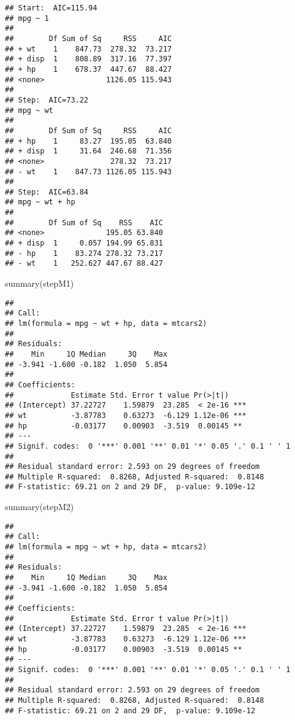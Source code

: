 \documentclass[
]{book}
\newenvironment{Shaded}{\begin{snugshade}}{\end{snugshade}}
\newcommand{\FunctionTok}[1]{\textcolor[rgb]{0.00,0.00,0.00}{#1}}
\newcommand{\NormalTok}[1]{#1}
\begin{document}
\begin{verbatim}
## Start:  AIC=115.94
## mpg ~ 1
## 
##        Df Sum of Sq     RSS     AIC
## + wt    1    847.73  278.32  73.217
## + disp  1    808.89  317.16  77.397
## + hp    1    678.37  447.67  88.427
## <none>              1126.05 115.943
## 
## Step:  AIC=73.22
## mpg ~ wt
## 
##        Df Sum of Sq     RSS     AIC
## + hp    1     83.27  195.05  63.840
## + disp  1     31.64  246.68  71.356
## <none>               278.32  73.217
## - wt    1    847.73 1126.05 115.943
## 
## Step:  AIC=63.84
## mpg ~ wt + hp
## 
##        Df Sum of Sq    RSS    AIC
## <none>              195.05 63.840
## + disp  1     0.057 194.99 65.831
## - hp    1    83.274 278.32 73.217
## - wt    1   252.627 447.67 88.427
\end{verbatim}

\begin{Shaded}
\begin{Highlighting}[]
\FunctionTok{summary}\NormalTok{(stepM1)}
\end{Highlighting}
\end{Shaded}

\begin{verbatim}
## 
## Call:
## lm(formula = mpg ~ wt + hp, data = mtcars2)
## 
## Residuals:
##    Min     1Q Median     3Q    Max 
## -3.941 -1.600 -0.182  1.050  5.854 
## 
## Coefficients:
##             Estimate Std. Error t value Pr(>|t|)    
## (Intercept) 37.22727    1.59879  23.285  < 2e-16 ***
## wt          -3.87783    0.63273  -6.129 1.12e-06 ***
## hp          -0.03177    0.00903  -3.519  0.00145 ** 
## ---
## Signif. codes:  0 '***' 0.001 '**' 0.01 '*' 0.05 '.' 0.1 ' ' 1
## 
## Residual standard error: 2.593 on 29 degrees of freedom
## Multiple R-squared:  0.8268, Adjusted R-squared:  0.8148 
## F-statistic: 69.21 on 2 and 29 DF,  p-value: 9.109e-12
\end{verbatim}

\begin{Shaded}
\begin{Highlighting}[]
\FunctionTok{summary}\NormalTok{(stepM2)}
\end{Highlighting}
\end{Shaded}

\begin{verbatim}
## 
## Call:
## lm(formula = mpg ~ wt + hp, data = mtcars2)
## 
## Residuals:
##    Min     1Q Median     3Q    Max 
## -3.941 -1.600 -0.182  1.050  5.854 
## 
## Coefficients:
##             Estimate Std. Error t value Pr(>|t|)    
## (Intercept) 37.22727    1.59879  23.285  < 2e-16 ***
## wt          -3.87783    0.63273  -6.129 1.12e-06 ***
## hp          -0.03177    0.00903  -3.519  0.00145 ** 
## ---
## Signif. codes:  0 '***' 0.001 '**' 0.01 '*' 0.05 '.' 0.1 ' ' 1
## 
## Residual standard error: 2.593 on 29 degrees of freedom
## Multiple R-squared:  0.8268, Adjusted R-squared:  0.8148 
## F-statistic: 69.21 on 2 and 29 DF,  p-value: 9.109e-12
\end{verbatim}
\end{document}
